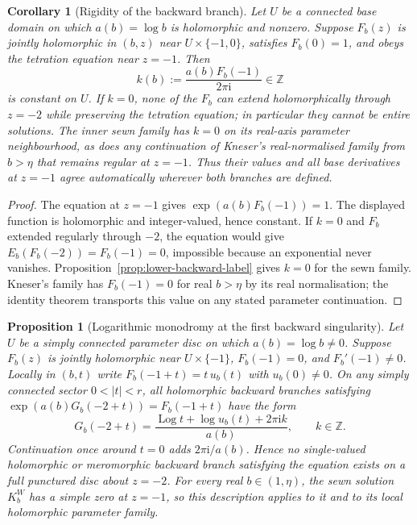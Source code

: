 \documentclass[11pt]{amsart}
\newtheorem{proposition}[theorem]{Proposition}
\newtheorem{corollary}[theorem]{Corollary}
\theoremstyle{definition}
\newcommand{\Kk}{K}
\newcommand{\ii}{\mathrm{i}}
\begin{document}
\begin{corollary}[Rigidity of the backward branch]
\label{cor:backward-rigidity}
Let $U$ be a connected base domain on which $a(b)=\log b$ is holomorphic
and nonzero.  Suppose $F_b(z)$ is jointly holomorphic in $(b,z)$ near
$U\times\{-1,0\}$, satisfies $F_b(0)=1$, and obeys the tetration equation
near $z=-1$.  Then
\[
 k(b):=\frac{a(b)F_b(-1)}{2\pi\ii}\in\mathbb Z
\]
is constant on $U$.  If $k=0$, none of the $F_b$ can extend
holomorphically through $z=-2$ while preserving the tetration equation;
in particular they cannot be entire solutions.  The inner sewn family
has $k=0$ on its real-axis parameter neighbourhood, as does any
continuation of Kneser's real-normalised family from $b>\eta$ that
remains regular at $z=-1$.  Thus their values and all base derivatives
at $z=-1$ agree automatically wherever both branches are defined.
\end{corollary}

\begin{proof}
The equation at $z=-1$ gives $\exp(a(b)F_b(-1))=1$.
The displayed function is holomorphic and integer-valued, hence
constant.  If $k=0$ and $F_b$ extended regularly through $-2$, the
equation would give $E_b(F_b(-2))=F_b(-1)=0$, impossible because an
exponential never vanishes.  Proposition~\ref{prop:lower-backward-label}
gives $k=0$ for the sewn family.  Kneser's family has $F_b(-1)=0$ for
real $b>\eta$ by its real normalisation; the identity theorem transports
this value on any stated parameter continuation.
\end{proof}

\begin{proposition}[Logarithmic monodromy at the first backward singularity]
\label{prop:backward-log-monodromy}
Let $U$ be a simply connected parameter disc on which $a(b)=\log b\ne0$.
Suppose $F_b(z)$ is jointly holomorphic near $U\times\{-1\}$,
$F_b(-1)=0$, and $F_b'(-1)\ne0$.  Locally in $(b,t)$ write
$F_b(-1+t)=t\,u_b(t)$ with $u_b(0)\ne0$.  On any simply connected
sector $0<|t|<r$, all holomorphic backward branches satisfying
$\exp(a(b)G_b(-2+t))=F_b(-1+t)$ have the form
\[
 G_b(-2+t)=\frac{\operatorname{Log}t+\log u_b(t)+2\pi\ii k}{a(b)},
 \qquad k\in\mathbb Z.
\]
Continuation once around $t=0$ adds $2\pi\ii/a(b)$.  Hence no
single-valued holomorphic or meromorphic backward branch satisfying
the equation exists on a full punctured disc about $z=-2$.
For every real $b\in(1,\eta)$, the sewn solution $\Kk_b^W$ has a
simple zero at $z=-1$, so this description applies to it and to its
local holomorphic parameter family.
\end{proposition}
\end{document}
